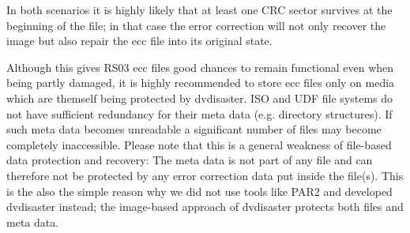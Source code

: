 In both scenarios it is highly likely that at least one CRC sector survives
at the beginning of the file; in that case the error correction will not
only recover the image but also repair the ecc file into its original state.

\bigskip

Although this gives RS03 ecc files good chances to remain functional even
when being partly damaged, it is highly recommended to store ecc files 
only on media which are themself being protected by dvdisaster. 
ISO and UDF file systems
do not have sufficient redundancy for their meta data (e.g. directory
structures). If such meta data becomes unreadable a significant
number of files may become completely inaccessible. 
Please note that this is a
general weakness of file-based data protection and recovery: The
meta data is not part of any file and can therefore not be protected by
any error correction data put inside the file(s). 
\smallskip
This is the also the simple reason why we did not use tools like PAR2 
and developed dvdisaster instead; 
the image-based approach of dvdisaster protects
both files and meta data.
